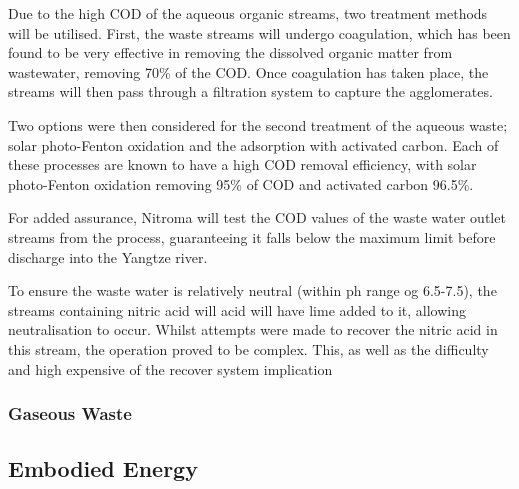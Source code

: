 Due to the high COD of the aqueous organic streams, two treatment methods will be utilised. First, the waste streams will undergo coagulation, which has been found to be very effective in removing the dissolved organic matter from wastewater, removing 70\% of the COD. Once coagulation has taken place, the streams will then pass through a filtration system to capture the agglomerates. 



Two options were then considered for the second treatment of the aqueous waste; solar photo-Fenton oxidation and the adsorption with activated carbon. Each of these processes are known to have a high COD removal efficiency, with solar photo-Fenton oxidation removing 95\% of COD and activated carbon 96.5\%. 

For added assurance, Nitroma will test the COD values of the waste water outlet streams from the process, guaranteeing it falls below the maximum limit before discharge into the Yangtze river. 





To ensure the waste water is relatively neutral (within ph range og 6.5-7.5), the streams containing nitric acid will acid will have lime added to it, allowing neutralisation to occur. Whilst attempts were made to recover the nitric acid in this stream, the operation proved to be complex. This, as well as the difficulty and high expensive of the recover system implication 



\subsubsection{Gaseous Waste}

\subsection{Embodied Energy}